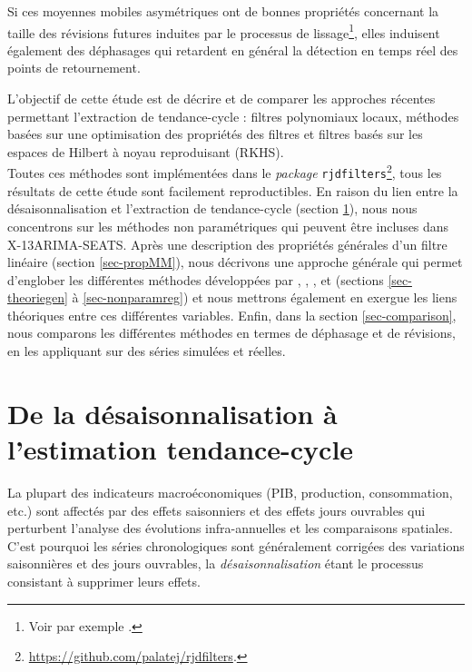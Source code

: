 \documentclass[
  12pt,
  a4paper,french]{article}
\newcommand\1{\mathds{1}}
\begin{document}
Si ces moyennes mobiles asymétriques ont de bonnes propriétés concernant la taille des révisions futures induites par le processus de lissage\footnote{Voir par exemple \textcite{pierce1980SA}.}, elles induisent également des déphasages qui retardent en général la détection en temps réel des points de retournement.

L'objectif de cette étude est de décrire et de comparer les approches récentes permettant l'extraction de tendance-cycle : filtres polynomiaux locaux, méthodes basées sur une optimisation des propriétés des filtres et filtres basés sur les espaces de Hilbert à noyau reproduisant (RKHS).\\
Toutes ces méthodes sont implémentées dans le \emph{package}  \texttt{rjdfilters}\footnote{\url{https://github.com/palatej/rjdfilters}.}, tous les résultats de cette étude sont facilement reproductibles.
En raison du lien entre la désaisonnalisation et l'extraction de tendance-cycle (section \ref{sec-SAtoTCE}), nous nous concentrons sur les méthodes non paramétriques qui peuvent être incluses dans X-13ARIMA-SEATS.
Après une description des propriétés générales d'un filtre linéaire (section \ref{sec-propMM}), nous décrivons une approche générale qui permet d'englober les différentes méthodes développées par \textcite{proietti2008}, \textcite{GrayThomson1996}, \textcite{ch15HBSA}, \textcite{trilemmaWMR2019} et \textcite{dagumbianconcini2008} (sections \ref{sec-theoriegen} à \ref{sec-nonparamreg}) et nous mettrons également en exergue les liens théoriques entre ces différentes variables.
Enfin, dans la section \ref{sec-comparison}, nous comparons les différentes méthodes en termes de déphasage et de révisions, en les appliquant sur des séries simulées et réelles.

\newpage

\hypertarget{sec-SAtoTCE}{%
\section{De la désaisonnalisation à l'estimation tendance-cycle}\label{sec-SAtoTCE}}

La plupart des indicateurs macroéconomiques (PIB, production, consommation, etc.) sont affectés par des effets saisonniers et des effets jours ouvrables qui perturbent l'analyse des évolutions infra-annuelles et les comparaisons spatiales.
C'est pourquoi les séries chronologiques sont généralement corrigées des variations saisonnières et des jours ouvrables, la \emph{désaisonnalisation} étant le processus consistant à supprimer leurs effets.
\end{document}

